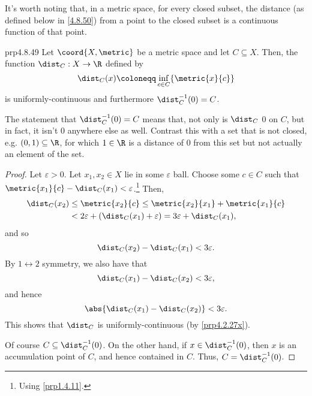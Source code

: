 It's worth noting that, in a metric space, for every closed subset, the distance (as defined below in \eqref{4.8.50}) from a point to the closed subset is a continuous function of that point.
\begin{prp}{}{prp4.8.49}
Let $\coord{X,\metric}$ be a metric space and let $C\subseteq X$.  Then, the function $\dist _C:X\rightarrow \R$ defined by
\begin{equation}\label{4.8.50}
\dist _C(x)\coloneqq \inf _{c\in C}\{ \metric{x}{c}\} 
\end{equation}
is uniformly-continuous and furthermore $\dist _C^{-1}(0)=C$.
\begin{rmk}
The statement that $\dist _C^{-1}(0)=C$ means that, not only is $\dist _C$ $0$ on $C$, but in fact, it isn't $0$ anywhere else as well.  Contrast this with a set that is not closed, e.g. $(0,1)\subseteq \R$, for which $1\in \R$ is a distance of $0$ from this set but not actually an element of the set.
\end{rmk}
\begin{proof}
Let $\varepsilon >0$.  Let $x_1,x_2\in X$ lie in some $\varepsilon$ ball.  Choose some $c\in C$ such that $\metric{x_1}{c}-\dist_C(x_1)<\varepsilon$.\footnote{Using \cref{prp1.4.11}.}  Then,
\begin{equation}
\begin{split}
\dist _C(x_2) & \leq \metric{x_2}{c}\leq \metric{x_2}{x_1}+\metric{x_1}{c} \\
& <2\varepsilon +(\dist _C(x_1)+\varepsilon )=3\varepsilon +\dist _C(x_1),
\end{split}
\end{equation}
and so
\begin{equation}
\dist _C(x_2)-\dist _C(x_1)<3\varepsilon .
\end{equation}
By $1\leftrightarrow 2$ symmetry, we also have that
\begin{equation}
\dist _C(x_1)-\dist _C(x_2)<3\varepsilon ,
\end{equation}
and hence
\begin{equation}
\abs{\dist _C(x_1)-\dist _C(x_2)}<3\varepsilon .
\end{equation}
This shows that $\dist _C$ is uniformly-continuous (by \cref{prp4.2.27x}).

Of course $C\subseteq \dist _C^{-1}(0)$.  On the other hand, if $x\in \dist _C^{-1}(0)$, then $x$ is an accumulation point of $C$, and hence contained in $C$.  Thus, $C=\dist _C^{-1}(0)$.
\end{proof}
\end{prp}


